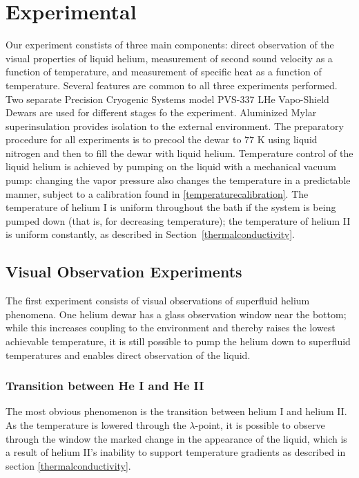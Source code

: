 
\section{Experimental}\label{experimental}

Our experiment constists of three main components: direct observation
of the visual properties of liquid helium, measurement of second sound
velocity as a function of temperature, and measurement of specific
heat as a function of temperature. Several features are common to all
three experiments performed. Two separate Precision Cryogenic Systems
model PVS-337 LHe Vapo-Shield Dewars are used for different stages fo
the experiment. Aluminized Mylar superinsulation provides isolation to
the external environment. The preparatory procedure for all
experiments is to precool the dewar to $77$ K using liquid nitrogen
and then to fill the dewar with liquid helium. Temperature control of
the liquid helium is achieved by pumping on the liquid with a
mechanical vacuum pump: changing the vapor pressure also changes the
temperature in a predictable manner, subject to a calibration found in
\ref{temperaturecalibration}. The temperature of helium I is uniform
throughout the bath if the system is being pumped down (that is, for
decreasing temperature); the temperature of helium II is uniform
constantly, as described in Section~\ref{thermalconductivity}.

\subsection{Visual Observation Experiments}

The first experiment consists of visual observations of superfluid
helium phenomena. One helium dewar has a glass observation window near
the bottom; while this increases coupling to the environment and
thereby raises the lowest achievable temperature, it is still possible
to pump the helium down to superfluid temperatures and enables direct
observation of the liquid.

\subsubsection{Transition between He I and He II}

The most obvious phenomenon is the transition between helium I and helium II. As the temperature is lowered through the $\lambda$-point, it is possible to observe through the window the marked change in the appearance of the liquid, which is a result of helium II's inability to support temperature gradients as described in section \ref{thermalconductivity}.

